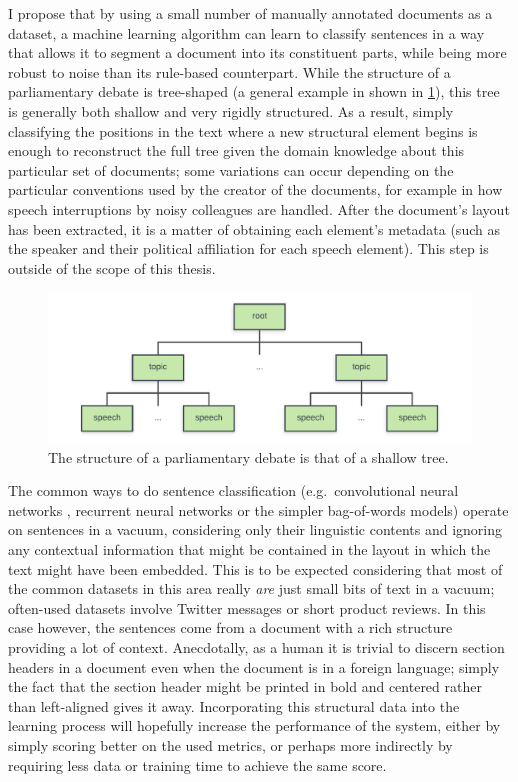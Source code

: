 I propose that by using a small number of manually annotated documents as a
dataset, a machine learning algorithm can learn to classify sentences in a way
that allows it to segment a document into its constituent parts, while being
more robust to noise than its rule-based counterpart. While the structure of a
parliamentary debate is tree-shaped (a general example in shown in
\cref{fig:tree}), this tree is generally both shallow and very rigidly
structured. As a result, simply classifying the positions in the text where a
new structural element begins is enough to reconstruct the full tree given the
domain knowledge about this particular set of documents; some variations can
occur depending on the particular conventions used by the creator of the
documents, for example in how speech interruptions by noisy colleagues are
handled. After the document's layout has been extracted, it is a matter of
obtaining each element's metadata (such as the speaker and their political
affiliation for each speech element). This step is outside of the scope of this
thesis.
\begin{figure}[tb]
  \centering
  \includegraphics[width=\textwidth]{figures/tree.pdf}
  \caption{The structure of a parliamentary debate is that of a shallow
    tree.\label{fig:tree}}
\end{figure}

The common ways to do sentence classification (e.g.\ convolutional neural
networks \citep{kim2014conv}, recurrent neural networks or the simpler
bag-of-words models) operate on sentences in a vacuum, considering only their
linguistic contents and ignoring any contextual information that might be
contained in the layout in which the text might have been embedded. This is to
be expected considering that most of the common datasets in this area really
\emph{are} just small bits of text in a vacuum; often-used datasets involve
Twitter messages or short product reviews. In this case however, the sentences
come from a document with a rich structure providing a lot of context.
Anecdotally, as a human it is trivial to discern section headers in a document
even when the document is in a foreign language; simply the fact that the
section header might be printed in bold and centered rather than left-aligned
gives it away.  Incorporating this structural data into the learning process
will hopefully increase the performance of the system, either by simply scoring
better on the used metrics, or perhaps more indirectly by requiring less data or
training time to achieve the same score.

